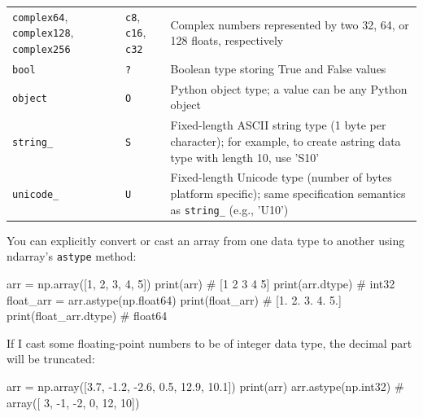 \begin{table}
\begin{tabularx}{\textwidth}{llX}
        \verb|complex64|, \verb|complex128|, \verb|complex256| & \verb|c8|, \verb|c16|, \verb|c32| & Complex numbers represented by two 32, 64, or 128 floats, respectively                                                      \\
        \verb|bool|                                            & \verb|?|                          & Boolean type storing True and False values                                                                                  \\
        \verb|object|                                          & \verb|O|                          & Python object type; a value can be any Python object                                                                        \\
        \verb|string_|                                         & \verb|S|                          & Fixed-length ASCII string type (1 byte per character); for example, to create astring data type with length 10, use 'S10'   \\                                                                                                                          
        \verb|unicode_|                                        & \verb|U|                          & Fixed-length Unicode type (number of bytes platform specific); same specification semantics as \verb|string_| (e.g., 'U10') \\
        \hline
    \end{tabularx}
\end{table}


You can explicitly convert or cast an array from one data type to another using ndarray's \verb|astype| method:
\begin{pyc}
arr = np.array([1, 2, 3, 4, 5])
print(arr) # [1 2 3 4 5]
print(arr.dtype) # int32
float_arr = arr.astype(np.float64)
print(float_arr) # [1. 2. 3. 4. 5.]
print(float_arr.dtype) # float64
\end{pyc}

If I cast some floating-point numbers to be of integer data type, the decimal part will be truncated:
\begin{pyc}
arr = np.array([3.7, -1.2, -2.6, 0.5, 12.9, 10.1])
print(arr)
arr.astype(np.int32)
# array([ 3, -1, -2,  0, 12, 10])
\end{pyc}

